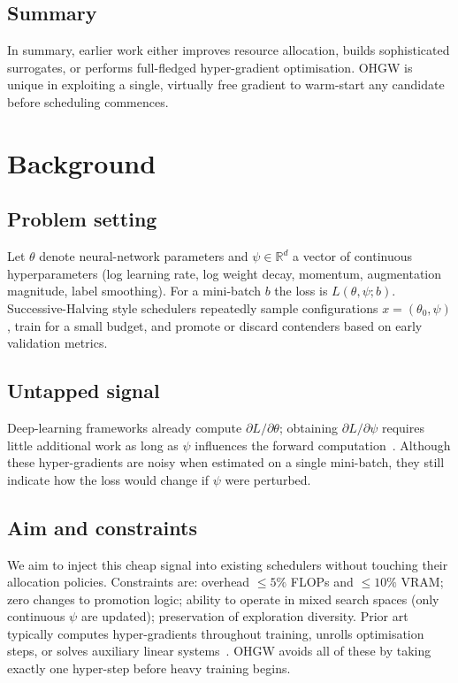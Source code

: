 \documentclass{article} %
\begin{document}
\subsection{Summary}
In summary, earlier work either improves resource allocation, builds sophisticated surrogates, or performs full-fledged hyper-gradient optimisation. OHGW is unique in exploiting a single, virtually free gradient to warm-start any candidate before scheduling commences.

\section{Background}\label{sec:background}
\subsection{Problem setting}
Let \(\theta\) denote neural-network parameters and \(\psi\in\mathbb{R}^d\) a vector of continuous hyperparameters (log learning rate, log weight decay, momentum, augmentation magnitude, label smoothing). For a mini-batch \(b\) the loss is \(L(\theta,\psi; b)\). Successive-Halving style schedulers repeatedly sample configurations \(x=(\theta_0,\psi)\), train for a small budget, and promote or discard contenders based on early validation metrics.

\subsection{Untapped signal}
Deep-learning frameworks already compute \(\partial L/\partial \theta\); obtaining \(\partial L/\partial \psi\) requires little additional work as long as \(\psi\) influences the forward computation~\cite{chandra-2019-gradient}. Although these hyper-gradients are noisy when estimated on a single mini-batch, they still indicate how the loss would change if \(\psi\) were perturbed.

\subsection{Aim and constraints}
We aim to inject this cheap signal into existing schedulers without touching their allocation policies. Constraints are: overhead \(\leq 5\%\) FLOPs and \(\leq 10\%\) VRAM\@; zero changes to promotion logic; ability to operate in mixed search spaces (only continuous \(\psi\) are updated); preservation of exploration diversity. Prior art typically computes hyper-gradients throughout training, unrolls optimisation steps, or solves auxiliary linear systems~\cite{bertrand-2020-implicit,immer-2023-stochastic}. OHGW avoids all of these by taking exactly one hyper-step before heavy training begins.
\end{document}
